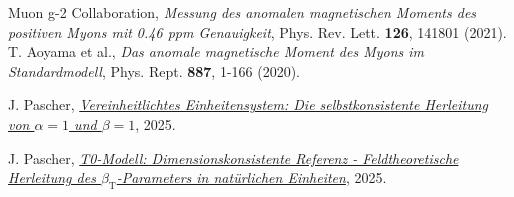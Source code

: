 \documentclass[12pt,a4paper]{article}
\newcommand{\betaT}{\beta_{\text{T}}}
\begin{document}
	\begin{thebibliography}{99}
		 Muon g-2 Collaboration, \textit{Messung des anomalen magnetischen Moments des positiven Myons mit 0.46 ppm Genauigkeit}, Phys. Rev. Lett. \textbf{126}, 141801 (2021).
		 T. Aoyama et al., \textit{Das anomale magnetische Moment des Myons im Standardmodell}, Phys. Rept. \textbf{887}, 1-166 (2020).
		
	
		
		
	
		
		
		
		 J. Pascher, \href{https://github.com/jpascher/T0-Time-Mass-Duality/blob/main/2/pdf/NatEinheitenSystematikEn.pdf}{\textit{Vereinheitlichtes Einheitensystem: Die selbstkonsistente Herleitung von $\alpha = 1$ und $\beta = 1$}}, 2025.
		
		 J. Pascher, \href{https://github.com/jpascher/T0-Time-Mass-Duality/blob/main/2/pdf/DerivationVonBetaEn.pdf}{\textit{T0-Modell: Dimensionskonsistente Referenz - Feldtheoretische Herleitung des $\betaT$-Parameters in natürlichen Einheiten}}, 2025.
		
		
	\end{thebibliography}
	
\end{document}
